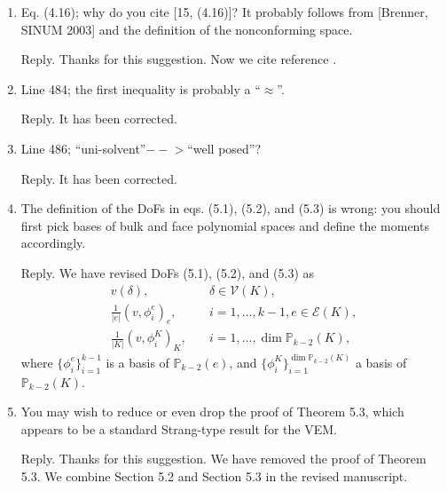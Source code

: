 \documentclass[10pt]{amsart}
\theoremstyle{definition}
\theoremstyle{remark}
\begin{document}
\begin{enumerate}[1.]
\medskip

\item \textsf{Eq. (4.16); why do you cite [15, (4.16)]? It probably follows from [Brenner, SINUM 2003] and the definition of the nonconforming space.}

\smallskip \noindent \textcolor[rgb]{1.00,0.00,0.00}{Reply.}
Thanks for this suggestion.
Now we cite reference \cite{Brenner2003}.

\medskip

\item \textsf{Line 484; the first inequality is probably a “$\approx$”.}

\smallskip \noindent \textcolor[rgb]{1.00,0.00,0.00}{Reply.}
It has been corrected.

\medskip

\item \textsf{Line 486; “uni-solvent”$-\!\!\!-\!\!\!>$“well posed”?}

\smallskip \noindent \textcolor[rgb]{1.00,0.00,0.00}{Reply.}
It has been corrected.

\medskip

\item \textsf{The definition of the DoFs in eqs. (5.1), (5.2), and (5.3) is wrong: you should first pick bases of bulk and face polynomial spaces and define the moments accordingly.}

\smallskip \noindent \textcolor[rgb]{1.00,0.00,0.00}{Reply.}
We have revised DoFs (5.1), (5.2), and (5.3) as
\begin{align*}
v(\delta), & \quad \delta\in\mathcal V(K), \\
\frac{1}{|e|}(v, \phi_i^e)_e, & \quad i=1,\ldots, k-1, e\in\mathcal E(K), \\
\frac{1}{|K|}(v, \phi_i^K)_K, & \quad i=1,\ldots, \dim\mathbb P_{k-2}(K),
\end{align*}
where $\{\phi_i^e\}_{i=1}^{k-1}$ is a basis of $\mathbb P_{k-2}(e)$, and $\{\phi_i^K\}_{i=1}^{\dim\mathbb P_{k-2}(K)}$ a basis of $\mathbb P_{k-2}(K)$.

\medskip

\item \textsf{You may wish to reduce or even drop the proof of Theorem 5.3, which appears to be a standard Strang-type result for the VEM.}

\smallskip \noindent \textcolor[rgb]{1.00,0.00,0.00}{Reply.}
Thanks for this suggestion. We have removed the proof of Theorem 5.3.
We combine Section 5.2 and Section 5.3 in the revised manuscript.


\end{enumerate}
\end{document}
